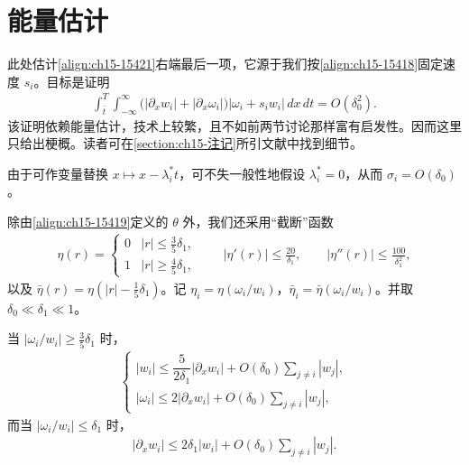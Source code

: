 \documentclass[../../main.tex]{subfiles}
\begin{document}
\section{能量估计}\label{section:ch15-能量估计}

此处估计\eqref{align:ch15-15421}右端最后一项，它源于我们按\eqref{align:ch15-15418}固定速度 $s_i$。目标是证明
\begin{align}
\int_{\bar t}^{T}\int_{-\infty}^{\infty}\bigl(|\partial_xw_i|+|\partial_x\omega_i|\bigr)|\omega_i+s_iw_i|\,dx\,dt=O(\delta_0^2).
\label{align:ch15-1571}
\end{align}
该证明依赖能量估计，技术上较繁，且不如前两节讨论那样富有启发性。因而这里只给出梗概。读者可在\cref{section:ch15-注记}所引文献中找到细节。

由于可作变量替换 $x\mapsto x-\lambda_i^*t$，可不失一般性地假设 $\lambda_i^*=0$，从而 $\sigma_i=O(\delta_0)$。

除由\eqref{align:ch15-15419}定义的 $\theta$ 外，我们还采用“截断”函数
\begin{align}
\eta(r)=
\begin{cases}
0&|r|\leqslant\frac35\delta_1,\\
1&|r|\geqslant\frac45\delta_1,
\end{cases}
\qquad|\eta'(r)|\leqslant\frac{20}{\delta_1},\qquad|\eta''(r)|\leqslant\frac{100}{\delta_1^2},
\label{align:ch15-1572}
\end{align}
以及 $\bar\eta(r)=\eta(|r|-\frac15\delta_1)$。记 $\eta_i=\eta(\omega_i/w_i)$，$\bar\eta_i=\bar\eta(\omega_i/w_i)$。并取 $\delta_0\ll\delta_1\ll1$。

\begin{lemma}\label{lemma:ch15-能量估计预备}
当 $|\omega_i/w_i|\geqslant\frac35\delta_1$ 时，
\begin{align}
\begin{cases}
|w_i|\leqslant\dfrac5{2\delta_1}|\partial_xw_i|+O(\delta_0)\displaystyle\sum_{j\neq i}|w_j|,\\[2mm]
|\omega_i|\leqslant2|\partial_xw_i|+O(\delta_0)\displaystyle\sum_{j\neq i}|w_j|,
\end{cases}
\label{align:ch15-1573}
\end{align}
而当 $|\omega_i/w_i|\leqslant\delta_1$ 时，
\begin{align}
|\partial_xw_i|\leqslant2\delta_1|w_i|+O(\delta_0)\sum_{j\neq i}|w_j|.
\label{align:ch15-1574}
\end{align}
\end{lemma}
\end{document}
